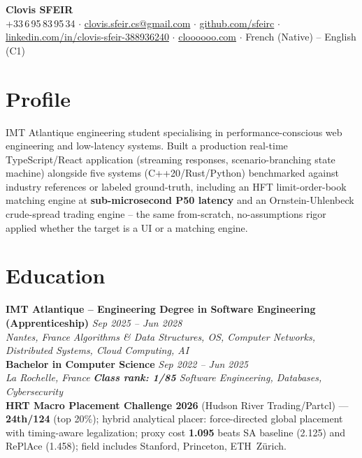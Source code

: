 \documentclass[10pt]{article}
\newcommand{\entry}[4]{%
  \noindent\textbf{#1} \hfill \textit{#2} \\
  \textit{#3} \hfill \textit{#4}\\[-0.3em]
}
\begin{document}
\fontsize{9.3pt}{11pt}\selectfont
\begin{center}
  {\LARGE \textbf{Clovis SFEIR}}\\[0.3em]
  +33\,6\,95\,83\,95\,34 \;$\cdot$\; \href{mailto:clovis.sfeir.cs@gmail.com}{clovis.sfeir.cs@gmail.com} \;$\cdot$\;
  \href{https://github.com/sfeirc}{github.com/sfeirc} \;$\cdot$\;
  \href{https://linkedin.com/in/clovis-sfeir-388936240}{linkedin.com/in/clovis-sfeir-388936240} \;$\cdot$\;
  \href{https://cloooooo.com}{cloooooo.com} \;$\cdot$\; French (Native) -- English (C1)
\end{center}

\section*{Profile}
IMT Atlantique engineering student specialising in performance-conscious web engineering and low-latency systems. Built a production real-time TypeScript/React application (streaming responses, scenario-branching state machine) alongside five systems (C++20/Rust/Python) benchmarked against industry references or labeled ground-truth, including an HFT limit-order-book matching engine at \textbf{sub-microsecond P50 latency} and an Ornstein-Uhlenbeck crude-spread trading engine -- the same from-scratch, no-assumptions rigor applied whether the target is a UI or a matching engine.

\section*{Education}
\entry{IMT Atlantique -- Engineering Degree in Software Engineering (Apprenticeship)}{Sep 2025 -- Jun 2028}{Nantes, France}{Algorithms \& Data Structures, OS, Computer Networks, Distributed Systems, Cloud Computing, AI}
\entry{Bachelor in Computer Science}{Sep 2022 -- Jun 2025}{La Rochelle, France}{\textbf{Class rank: 1/85} \textbar{} Software Engineering, Databases, Cybersecurity}
\noindent\textbf{HRT Macro Placement Challenge 2026} (Hudson River Trading/Partcl) --- \textbf{24th/124} (top 20\%); hybrid analytical placer: force-directed global placement with timing-aware legalization; proxy cost \textbf{1.095} beats SA baseline (2.125) and RePlAce (1.458); field includes Stanford, Princeton, ETH~Z\"urich.
\end{document}
